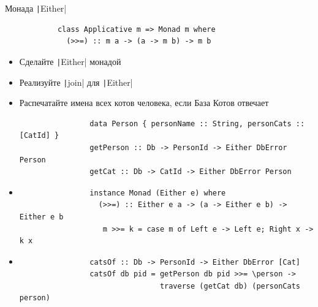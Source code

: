     \begin{frame}[fragile]{Монада \texttt|Either|}
        \begin{verbatim}
            class Applicative m => Monad m where
              (>>=) :: m a -> (a -> m b) -> m b
        \end{verbatim}
        \begin{itemize}
            \item[\todo] Сделайте \texttt|Either| монадой
            \item[\todo] Реализуйте \texttt|join| для \texttt|Either|
            \item[\todo] Распечатайте имена всех котов человека, если База Котов отвечает
            \begin{verbatim}
                data Person { personName :: String, personCats :: [CatId] }
                getPerson :: Db -> PersonId -> Either DbError Person
                getCat :: Db -> CatId -> Either DbError Person
            \end{verbatim}
            \item[\answer] \pause
            \begin{verbatim}
                instance Monad (Either e) where
                  (>>=) :: Either e a -> (a -> Either e b) -> Either e b
                   m >>= k = case m of Left e -> Left e; Right x -> k x
            \end{verbatim}
            \item[\answer] \pause
            \begin{verbatim}
                catsOf :: Db -> PersonId -> Either DbError [Cat]
                catsOf db pid = getPerson db pid >>= \person ->
                                traverse (getCat db) (personCats person)
            \end{verbatim}
        \end{itemize}
    \end{frame}

